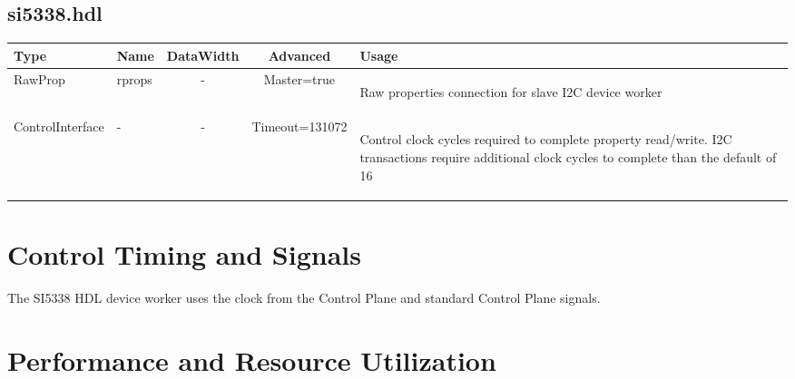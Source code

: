 \documentclass{article}
\def\comp{si5338}
\def\Comp{SI5338}
\begin{document}
\begin{landscape}
	\subsection*{\comp.hdl}
	\begin{scriptsize}
		\begin{tabular}{|M{2cm}|M{1.5cm}|c|c|M{12cm}|}
			\hline
			Type & Name & DataWidth & Advanced & Usage \\
			\hline
			RawProp
			& rprops
			& -
			& Master=true
			& \begin{flushleft}Raw properties connection for slave I2C device worker\end{flushleft}\\
			\hline
			ControlInterface
			& -
			& -
			& Timeout=131072
			& \begin{flushleft}Control clock cycles required to complete property  read/write. I2C transactions require additional clock cycles to complete than the default of 16 \end{flushleft}\\
			\hline
		\end{tabular}
	\end{scriptsize}
\end{landscape}

\section*{Control Timing and Signals}
The \Comp{} HDL device worker uses the clock from the Control Plane and standard Control Plane signals.

\section*{Performance and Resource Utilization}
\end{document}
